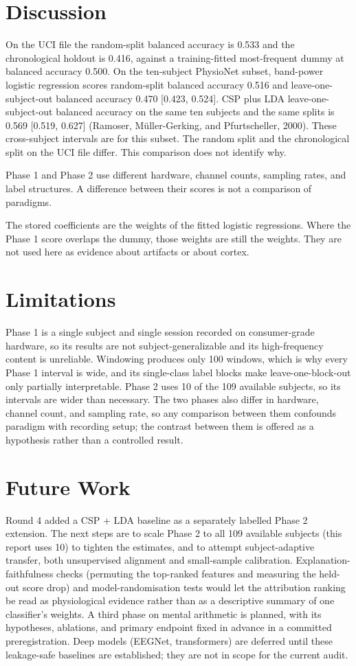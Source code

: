 \documentclass[11pt]{article}
\begin{document}
\section{Discussion}
On the UCI file the random-split balanced accuracy is 0.533 and the chronological holdout is 0.416, against a training-fitted most-frequent dummy at balanced accuracy 0.500. On the ten-subject PhysioNet subset, band-power logistic regression scores random-split balanced accuracy 0.516 and leave-one-subject-out balanced accuracy 0.470 [0.423, 0.524]. CSP plus LDA leave-one-subject-out balanced accuracy on the same ten subjects and the same splits is 0.569 [0.519, 0.627] (Ramoser, M\"uller-Gerking, and Pfurtscheller, 2000). These cross-subject intervals are for this subset. The random split and the chronological split on the UCI file differ. This comparison does not identify why.

Phase 1 and Phase 2 use different hardware, channel counts, sampling rates, and label structures. A difference between their scores is not a comparison of paradigms.

The stored coefficients are the weights of the fitted logistic regressions. Where the Phase 1 score overlaps the dummy, those weights are still the weights. They are not used here as evidence about artifacts or about cortex.

\section{Limitations}
Phase 1 is a single subject and single session recorded on consumer-grade hardware, so its results are not subject-generalizable and its high-frequency content is unreliable. Windowing produces only 100 windows, which is why every Phase 1 interval is wide, and its single-class label blocks make leave-one-block-out only partially interpretable. Phase 2 uses 10 of the 109 available subjects, so its intervals are wider than necessary. The two phases also differ in hardware, channel count, and sampling rate, so any comparison between them confounds paradigm with recording setup; the contrast between them is offered as a hypothesis rather than a controlled result.

\section{Future Work}
Round 4 added a CSP + LDA baseline as a separately labelled Phase 2 extension. The next steps are to scale Phase 2 to all 109 available subjects (this report uses 10) to tighten the estimates, and to attempt subject-adaptive transfer, both unsupervised alignment and small-sample calibration. Explanation-faithfulness checks (permuting the top-ranked features and measuring the held-out score drop) and model-randomisation tests would let the attribution ranking be read as physiological evidence rather than as a descriptive summary of one classifier's weights. A third phase on mental arithmetic is planned, with its hypotheses, ablations, and primary endpoint fixed in advance in a committed preregistration. Deep models (EEGNet, transformers) are deferred until these leakage-safe baselines are established; they are not in scope for the current audit.
\end{document}
